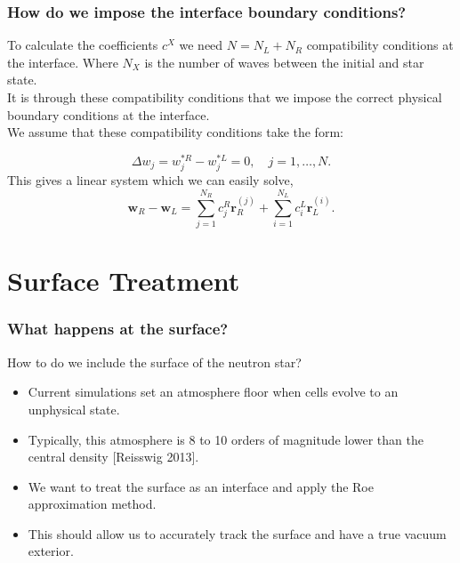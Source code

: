 \documentclass{beamer}
\begin{document}
\begin{frame}
\frametitle{How do we impose the interface boundary conditions?}
To calculate the coefficients $c^X$ we need  $N = N_L + N_R$ compatibility conditions at the interface. Where $N_X$ is the number of waves between the initial and star state.\\
It is through these compatibility conditions that we impose the correct physical boundary conditions at the interface.\\
We assume that these compatibility conditions take the form:

\begin{equation}
\Delta w_j = w^{*R}_j-w^{*L}_j = 0, \quad j = 1,\dots, N.
\end{equation}
This gives a linear system which we can easily solve,
\begin{equation}
\mathbf{w}_R - \mathbf{w}_L = \sum^{N_R}_{j=1}c^R_{j}\mathbf{r}^{(j)}_R +  \sum^{N_L}_{i=1}c^L_{i}\mathbf{r}^{(i)}_L.
\end{equation}
\end{frame}


\section{Surface Treatment}
\begin{frame}
\frametitle{What happens at the surface?}
How to do we include the surface of the neutron star?
\begin{itemize}
\item{Current simulations set an atmosphere floor when cells evolve to an unphysical state.}
\item{Typically, this atmosphere is 8 to 10 orders of magnitude lower than the central density [Reisswig 2013].}
\item{We want to treat the surface as an interface and apply the Roe approximation method.}
\item{This should allow us to accurately track the surface and have a true vacuum exterior.}
\end{itemize}
\end{frame}
\end{document}
